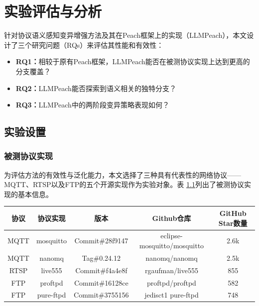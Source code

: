 \chapter{实验评估与分析}

针对协议语义感知变异增强方法及其在Peach框架上的实现（LLMPeach），本文设计了三个研究问题（RQs）来评估其性能和有效性：

\begin{itemize}
    \item \textbf{RQ1：}相较于原有Peach框架，LLMPeach能否在被测协议实现上达到更高的分支覆盖？
    \item \textbf{RQ2：}LLMPeach能否探索到语义相关的独特分支？
    \item \textbf{RQ3：}LLMPeach中的两阶段变异策略表现如何？
\end{itemize}

\section{实验设置}

\subsection{被测协议实现}

为评估方法的有效性与泛化能力，本文选择了三种具有代表性的网络协议——MQTT\cite{mqtt311}、RTSP\cite{rfc2326}以及FTP\cite{rfc959}的五个开源实现作为实验对象。表 \ref{tab:protocols}列出了被测协议实现的基本信息。


\begin{table}[H]
\centering
{}
\label{tab:protocols}
\begin{tabular}{ccccc}
\toprule
\textbf{协议} & \textbf{协议实现} & \textbf{版本}  & \textbf{Github仓库} & \textbf{GitHub Star数量}\\
\midrule
MQTT & mosquitto & Commit\#28f9147  & eclipse-mosquitto/mosquitto & 2.6k \\
MQTT & nanomq & Tag\#0.24.12 & nanomq/nanomq & 2.5k \\
RTSP & live555\footnotemark
 & Commit\#f4a4e8f  & rgaufman/live555 & 855 \\
FTP & proftpd & Commit\#16128ce & proftpd/proftpd & 582 \\
FTP & pure-ftpd & Commit\#3755156 & jedisct1
pure-ftpd & 748 \\
\bottomrule
\end{tabular}
\end{table}

